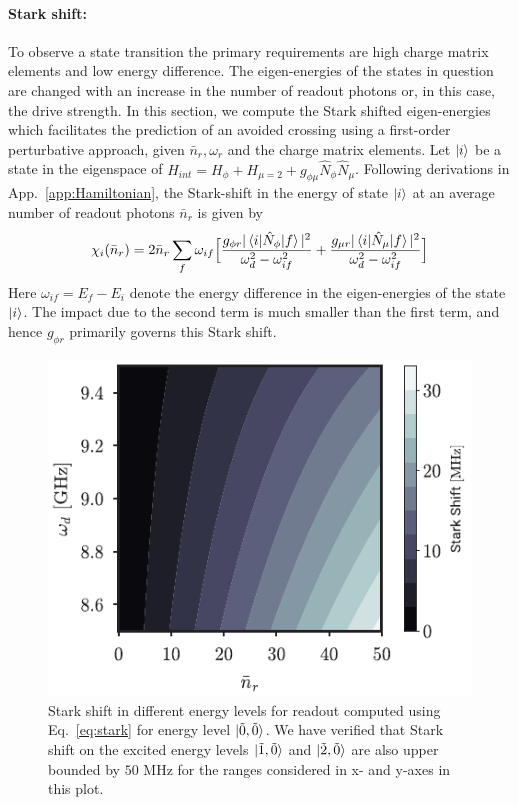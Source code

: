 \documentclass[%
reprint,
superscriptaddress,
 amsmath,amssymb,
 aps,
 prx,
longbibliography,
floatfix,
]{revtex4-2}
\begin{document}
\paragraph{Stark shift:}\label{app:stark-shift}
To observe a state transition the primary requirements are high charge matrix elements and low energy difference. The eigen-energies of the states in question are changed with an increase in the number of readout photons or, in this case, the drive strength. In this section, we compute the Stark shifted eigen-energies which facilitates the prediction of an avoided crossing using a first-order perturbative approach, given $\bar n_r, \omega_r$ and the charge matrix elements.  Let $\ket{i}$ be a state in the eigenspace of $H_{int}=H_\phi+H_{\mu=2}+g_{\phi\mu}\hat N_\phi\hat N_\mu$. Following derivations in App.~\ref{app:Hamiltonian}, the Stark-shift in the energy of state $\ket{i}$ at an average number of readout photons $\bar n_r$ is given by
\begin{align}
    \chi_i(\bar n_r)=2\bar n_r\sum_{f}\omega_{if}\Big[\frac{g_{\phi r}|\braket{i|\hat N_\phi|f}|^2}{\omega_d^2-\omega_{if}^2}+\frac{g_{\mu r}|\braket{i|\hat N_\mu|f}|^2}{\omega_d^2-\omega_{if}^2}\Big]\label{eq:stark}
\end{align}
 Here $\omega_{if}=E_f-E_i$ denote the energy difference in the eigen-energies of the state $\ket{i}$. The impact due to the second term is much smaller than the first term, and hence $g_{\phi r}$ primarily governs this Stark shift.
 \begin{figure}
     \centering
     \includegraphics[width=\linewidth]{Supp_Fig/Stark-shift.pdf}
     \caption{Stark shift in different energy levels for readout computed using Eq.~\ref{eq:stark} for energy level $\ket{\tilde{0},\tilde{0}}$. We have verified that Stark shift on the excited energy levels $\ket{\tilde{1},\tilde{0}}$ and $\ket{\tilde{2},\tilde{0}}$ are also upper bounded by $50$ MHz for the ranges considered in x- and y-axes in this plot.}
     \label{fig:stark-shift}
 \end{figure}
\end{document}
